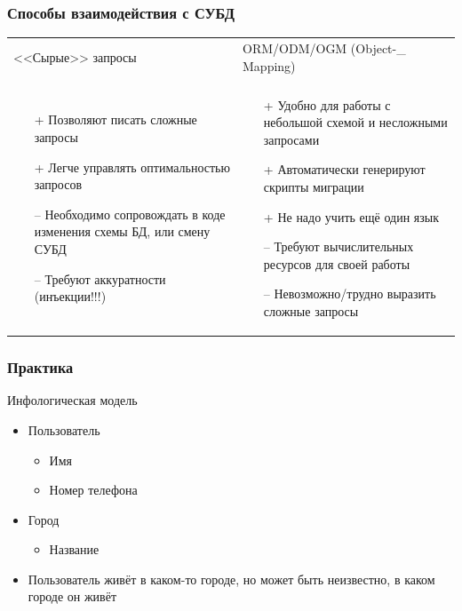 \documentclass[aspectratio=169]{beamer}
\begin{document}
\begin{frame}[fragile]
  \transwipe[direction=90]
  \frametitle{Способы взаимодействия с СУБД}

  \begin{tabular}{l l}
    <<Сырые>> запросы
    & 
    ORM/ODM/OGM (Object-\_ Mapping)
    \\
    \\
    \begin{minipage}{.45\textwidth}
      \begin{itemize}
        \item[+] Позволяют писать сложные запросы
        \item[+] Легче управлять оптимальностью запросов
        \item[--] Необходимо сопровождать в коде изменения схемы БД, или смену СУБД
        \item[--] Требуют аккуратности (инъекции!!!)
      \end{itemize}
    \end{minipage}
    & 
    \begin{minipage}{.5\textwidth}
      \begin{itemize}
        \item[+] Удобно для работы с небольшой схемой и несложными запросами
        \item[+] Автоматически генерируют скрипты миграции
        \item[+] Не надо учить ещё один язык
        \item[--] Требуют вычислительных ресурсов для своей работы
        \item[--] Невозможно/трудно выразить сложные запросы
      \end{itemize}
    \end{minipage}
  \end{tabular}
\end{frame}

\begin{frame}[fragile]
  \transwipe[direction=90]
  \frametitle{Практика}

  Инфологическая модель
  \begin{itemize}
    \item Пользователь
    \begin{itemize}
        \item Имя
        \item Номер телефона
    \end{itemize}
    \item Город
    \begin{itemize}
        \item Название
    \end{itemize}
    \item Пользователь живёт в каком-то городе, но может быть неизвестно, в каком городе он живёт
  \end{itemize}
  
\end{frame}
\end{document}
